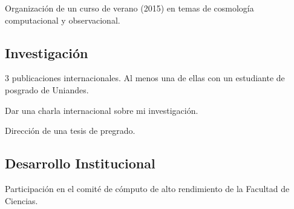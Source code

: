 \documentclass{article}
\begin{document}
Organizaci\'on de un curso de verano (2015) en temas de cosmolog\'ia
computacional y observacional.


\subsection{Investigaci\'on}
3 publicaciones internacionales. Al menos una de ellas con un
estudiante de posgrado de Uniandes.

Dar una charla internacional sobre mi investigaci\'on.

Direcci\'on de una tesis de pregrado.

\subsection{Desarrollo Institucional}
Participaci\'on en el comit\'e  de c\'omputo de alto rendimiento de la
Facultad de Ciencias.
\end{document}
